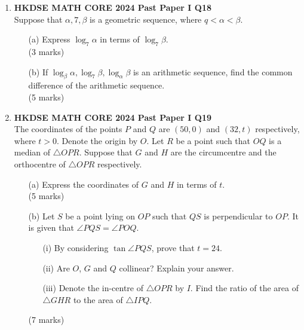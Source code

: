 \documentclass[12pt]{article}
\begin{document}
\begin{enumerate}
	\item \textbf{HKDSE MATH CORE 2024 Past Paper I Q18}\\
	Suppose that $\alpha , 7 , \beta $ is a geometric sequence, where $q < \alpha < \beta$.
	\begin{enumerate}
		\item[(a)] Express $\log_7{\alpha}$ in terms of $\log_7{\beta}$. \\(3 marks)
		\item[(b)] If $\log_{\beta}{\alpha}, \log_{7}{\beta}, \log_{\alpha}{\beta}$ is an arithmetic sequence, find the common difference of the arithmetic sequence. \\(5 marks)
	\end{enumerate}

	\item \textbf{HKDSE MATH CORE 2024 Past Paper I Q19}\\
	The coordinates of the points $P$ and $Q$ are $(50 , 0)$ and $(32 , t)$ respectively, where $t > 0$. Denote the origin by $O$. Let $R$ be a point such that $OQ$ is a median of $\triangle OPR$. Suppose that $G$ and $H$ are the circumcentre and the orthocentre of $\triangle OPR$ respectively.
	\begin{enumerate}
		\item[(a)] Express the coordinates of $G$ and $H$ in terms of $t$. \\(5 marks)
		\item[(b)] Let $S$ be a point lying on $OP$ such that $QS$ is perpendicular to $OP$. It is given that $\angle PQS = \angle POQ$.
		\begin{enumerate}
			\item[(i)] By considering $\tan{\angle PQS}$, prove that $t = 24$.
			\item[(ii)] Are $O$, $G$ and $Q$ collinear? Explain your answer.
			\item[(iii)] Denote the in-centre of $\triangle OPR$ by $I$. Find the ratio of the area of $\triangle GHR$ to the area of $\triangle IPQ$.
		\end{enumerate}
		(7 marks)
	\end{enumerate}


\end{enumerate}
\end{document}
